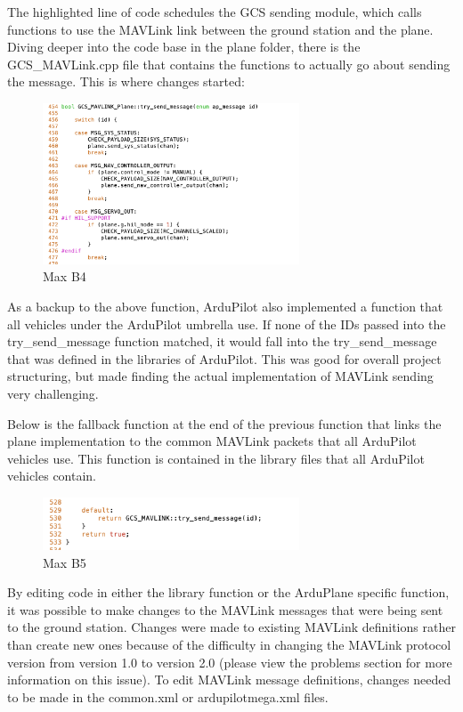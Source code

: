 \documentclass[12pt,journal,compsoc]{IEEEtran}
\begin{document}
The highlighted line of code schedules the GCS sending module, which calls functions to use the MAVLink link between the ground station and the plane. Diving deeper into the code base in the plane folder, there is the GCS\_MAVLink.cpp file that contains the functions to actually go about sending the message. This is where changes started:
\begin{figure}[h!]
\hspace*{0cm}
\centering
\includegraphics[width=3in]{GCS_Mavlink.png}
\caption{Max B4}
\label{gcsMav}
\end{figure}

As a backup to the above function, ArduPilot also implemented a function that all vehicles under the ArduPilot umbrella use. If none of the IDs passed into the try\_send\_message function matched, it would fall into the try\_send\_message that was defined in the libraries of ArduPilot.  This was good for overall project structuring, but made finding the actual implementation of MAVLink sending very challenging. 

Below is the fallback function at the end of the previous function that links the plane implementation to the common MAVLink packets that all ArduPilot vehicles use. This function is contained in the library files that all ArduPilot vehicles contain. 
\begin{figure}[h!]
\hspace*{0cm}
\centering
\includegraphics[width=3in]{Fallthrough.png}
\caption{Max B5}
\label{fallthrough}
\end{figure}

By editing code in either the library function or the ArduPlane specific function, it was possible to make changes to the MAVLink messages that were being sent to the ground station. 
Changes were made to existing MAVLink definitions rather than create new ones because of the difficulty in changing the MAVLink protocol version from version 1.0 to version 2.0 (please view the problems section for more information on this issue). To edit MAVLink message definitions, changes needed to be made in the common.xml or ardupilotmega.xml files.
\end{document}
